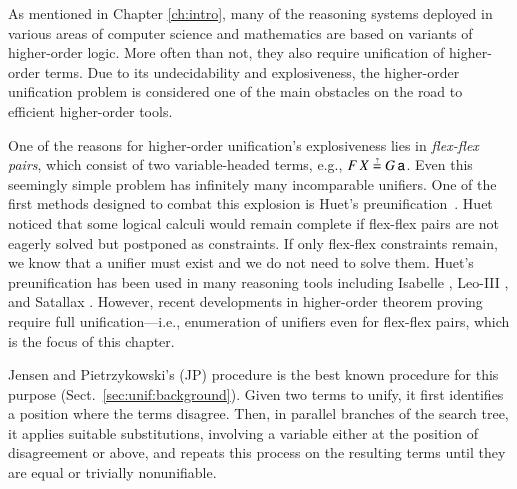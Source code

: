As mentioned in Chapter \ref{ch:intro}, many of the reasoning systems deployed
in various areas of computer science and mathematics are based on variants of
higher-order logic. More often than not, they also require unification of
higher-order terms. Due to its undecidability and explosiveness, the
higher-order unification problem is considered one of the main obstacles on the
road to efficient higher-order tools.

One of the reasons for higher-order unification's explosiveness lies in
\emph{flex-flex pairs}, which consist of two variable-headed terms,
e.g., $F \, X \unif G \, \cst{a}$. Even this seemingly simple
problem has infinitely many incomparable unifiers.
%
One of the first methods designed to combat this explosion is Huet's
preunification~\cite{gh-75-unification}. Huet noticed that some logical calculi
would remain complete if flex-flex pairs are not eagerly solved but postponed as
constraints. If only flex-flex constraints remain, we know that a unifier must
exist and we do not need to solve them.
%
Huet's preunification has been used in many reasoning tools including Isabelle
\cite{tn-02-isabelle}, Leo-III \cite{sb-21-leo3}, and Satallax
\cite{cb-12-satallax}. However, recent developments in higher-order theorem
proving~\cite{bbtvw-21-sup-lam,br-19-restricted-unif} require full unification---i.e., enumeration of unifiers even for
flex-flex pairs, which is the focus of this chapter.

Jensen and Pietrzykowski's (JP) procedure \cite{jp-76-unif} is the best known
procedure for this purpose (Sect.~\ref{sec:unif:background}). Given two terms to
unify, it first identifies a position where the terms disagree.
Then, in parallel branches of the search tree, it applies suitable substitutions, involving a
variable either at the position of disagreement or above, and repeats this process on
the resulting terms until they are equal or trivially nonunifiable.

